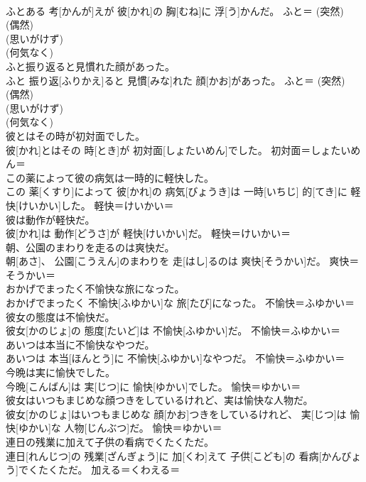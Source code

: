 \documentclass[8pt]{extreport}
\begin{document}
\begin{CJK}{UTF8}{min}
{\\	ふとある 考[かんが]えが 彼[かれ]の 胸[むね]に 浮[う]かんだ。	ふと＝ (突然) 
\\	(偶然) 
\\	(思いがけず) 
\\	(何気なく) 
\\	ふと振り返ると見慣れた顔があった。	
\\	ふと 振り返[ふりかえ]ると 見慣[みな]れた 顔[かお]があった。	ふと＝ (突然) 
\\	(偶然) 
\\	(思いがけず) 
\\	(何気なく) 
\\	彼とはその時が初対面でした。	
\\	彼[かれ]とはその 時[とき]が 初対面[しょたいめん]でした。	初対面＝しょたいめん＝ 
\\	この薬によって彼の病気は一時的に軽快した。	
\\	この 薬[くすり]によって 彼[かれ]の 病気[びょうき]は 一時[いちじ] 的[てき]に 軽快[けいかい]した。	軽快＝けいかい＝ 
\\	彼は動作が軽快だ。	
\\	彼[かれ]は 動作[どうさ]が 軽快[けいかい]だ。	軽快＝けいかい＝ 
\\	朝、公園のまわりを走るのは爽快だ。	
\\	朝[あさ]、 公園[こうえん]のまわりを 走[はし]るのは 爽快[そうかい]だ。	爽快＝そうかい＝ 
\\	おかげでまったく不愉快な旅になった。	
\\	おかげでまったく 不愉快[ふゆかい]な 旅[たび]になった。	不愉快＝ふゆかい＝ 
\\	彼女の態度は不愉快だ。	
\\	彼女[かのじょ]の 態度[たいど]は 不愉快[ふゆかい]だ。	不愉快＝ふゆかい＝ 
\\	あいつは本当に不愉快なやつだ。	
\\	あいつは 本当[ほんとう]に 不愉快[ふゆかい]なやつだ。	不愉快＝ふゆかい＝ 
\\	今晩は実に愉快でした。	
\\	今晩[こんばん]は 実[じつ]に 愉快[ゆかい]でした。	愉快＝ゆかい＝ 
\\	彼女はいつもまじめな顔つきをしているけれど、実は愉快な人物だ。	
\\	彼女[かのじょ]はいつもまじめな 顔[かお]つきをしているけれど、 実[じつ]は 愉快[ゆかい]な 人物[じんぶつ]だ。	愉快＝ゆかい＝ 
\\	連日の残業に加えて子供の看病でくたくただ。	
\\	連日[れんじつ]の 残業[ざんぎょう]に 加[くわ]えて 子供[こども]の 看病[かんびょう]でくたくただ。	加える＝くわえる＝ 
}
\end{CJK}
\end{document}

